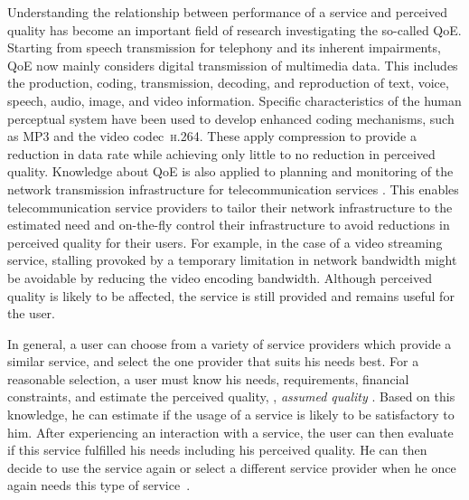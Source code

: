 Understanding the relationship between performance of a service and perceived quality has become an important field of research investigating the so-called \ac{QoE}.
Starting from speech transmission for telephony \citep[][]{ieee_audio_and_electroacoustics_group_ieee_1969} and its inherent impairments, \ac{QoE} now mainly considers digital transmission of multimedia data. %
This includes the production, coding, transmission, decoding, and reproduction of text, voice, speech, audio, image, and video information.
Specific characteristics of the human perceptual system have been used to develop enhanced coding mechanisms, such as \ac{MP3} and the video codec~\textsc{\lowercase{H.264}}.
These apply compression to provide a reduction in data rate while achieving only little to no reduction in perceived quality.
Knowledge about \ac{QoE} is also applied to planning and monitoring of the network transmission infrastructure for telecommunication services \citep[][]{schatz_qoe-based_2014}.
This enables telecommunication service providers to tailor their network infrastructure to the estimated need and on-the-fly control their infrastructure to avoid reductions in perceived quality for their users.
For example, in the case of a video streaming service, stalling provoked by a temporary limitation in network bandwidth might be avoidable by reducing the video encoding bandwidth.
Although perceived quality is likely to be affected, the service is still provided and remains useful for the user.

In general, a user can choose from a variety of service providers which provide a similar service, and select the one provider that suits his needs best.
For a reasonable selection, a user must know his needs, requirements, financial constraints, and estimate the perceived quality, \ie, \emph{assumed quality} \citep[][p.\,13]{raake_quality_2014}.
Based on this knowledge, he can estimate if the usage of a service is likely to be satisfactory to  him.
After experiencing an interaction with a service, the user can then evaluate if this service fulfilled his needs including his perceived quality.
He can then decide to use the service again or select a different service provider when he once again needs this type of service~\citep[][]{geerts_linking_2010}.

